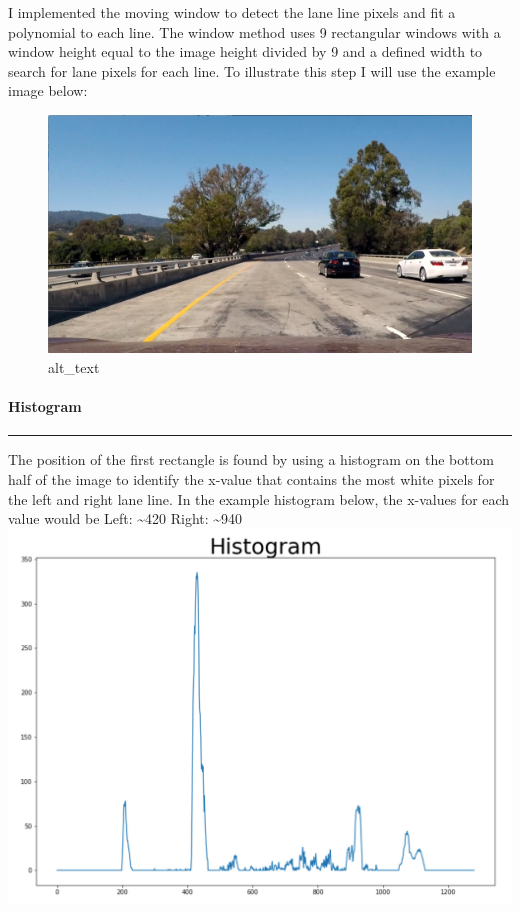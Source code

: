 \documentclass[11pt]{article}
\makeatletter
\def\maxwidth{\ifdim\Gin@nat@width>\linewidth\linewidth
    \else\Gin@nat@width\fi}
\let\Oldincludegraphics\includegraphics
\renewcommand{\includegraphics}[1]{\Oldincludegraphics[width=.8\maxwidth]{#1}}
\makeatother
\begin{document}
I implemented the moving window to detect the lane line pixels and fit a
polynomial to each line. The window method uses 9 rectangular windows
with a window height equal to the image height divided by 9 and a
defined width to search for lane pixels for each line. To illustrate
this step I will use the example image below:

\begin{figure}
\centering
\includegraphics{./test_images/test1.jpg}
\caption{alt\_text}
\end{figure}

\hypertarget{histogram}{%
\paragraph{Histogram}\label{histogram}}

\begin{center}\rule{0.5\linewidth}{\linethickness}\end{center}

The position of the first rectangle is found by using a histogram on the
bottom half of the image to identify the x-value that contains the most
white pixels for the left and right lane line. In the example histogram
below, the x-values for each value would be Left: \textasciitilde{}420
Right: \textasciitilde{}940
\includegraphics{./output_images/writeup_images/test1_histogram.png}
\end{document}
